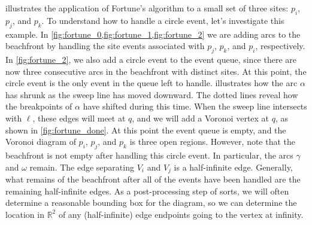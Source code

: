 \documentclass[12pt,twoside]{reedthesis}
\begin{document}
       illustrates the application of Fortune's algorithm to a small set of three sites: $p_{i}$, $p_{j}$, and $p_{k}$. To understand how to handle a circle event, let's investigate this example. In \cref{fig:fortune_0,fig:fortune_1,fig:fortune_2} we are adding arcs to the beachfront by handling the site events associated with $p_{j}$, $p_{k}$, and $p_{i}$, respectively. In \cref{fig:fortune_2}, we also add a circle event to the event queue, since there are now three consecutive arcs in the beachfront with distinct sites. At this point, the circle event is the only event in the queue left to handle.  illustrates how the arc $\alpha$ has shrunk as the sweep line has moved downward.  The dotted lines reveal how the breakpoints of $\alpha$ have shifted during this time. When the sweep line intersects with $\ell$, these edges will meet at $q$, and we will add a Voronoi vertex at $q$, as shown in \cref{fig:fortune_done}. At this point the event queue is empty, and the Voronoi diagram of $p_{i}$, $p_{j}$, and $p_{k}$ is three open regions.  However, note that the beachfront is not empty after handling this circle event. In particular, the arcs $\gamma$ and $\omega$ remain. The edge separating $V_{i}$ and $V_{j}$ is a half-infinite edge. Generally, what remains of the beachfront after all of the events have been handled are the remaining half-infinite edges. As a post-processing step of sorts, we will often determine a reasonable bounding box for the diagram, so we can determine the location in $\mathds{R}^2$ of any (half-infinite) edge endpoints going to the vertex at infinity.
   
\end{document}
